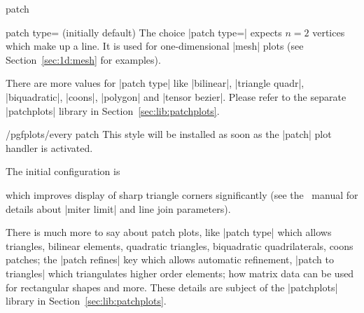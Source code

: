 {\begin{plottype}[/pgfplots]{patch}
\begin{pgfplotskey}{patch type= (initially default)}
	The choice |patch type=| expects $n=2$ vertices which make up a line. It is used for one-dimensional |mesh| plots (see Section~\ref{sec:1d:mesh} for examples).

	There are more values for |patch type| like |bilinear|, |triangle quadr|, |biquadratic|, |coons|, |polygon| and |tensor bezier|. Please refer to the separate |patchplots| library in Section~\ref{sec:lib:patchplots}.
\end{pgfplotskey}

\begin{stylekey}{/pgfplots/every patch}
	This style will be installed as soon as the |patch| plot handler is activated. 

	The initial configuration is
\begin{codeexample}
\end{codeexample}
	\noindent which improves display of sharp triangle corners significantly (see the \Tikz\ manual for details about |miter limit| and line join parameters).
\end{stylekey}

	There is much more to say about patch plots, like |patch type| which allows triangles, bilinear elements, quadratic triangles, biquadratic quadrilaterals, coons patches; the |patch refines| key which allows automatic refinement, |patch to triangles| which triangulates higher order elements;  how matrix data can be used for rectangular shapes and more. These details are subject of the |patchplots| library in Section~\ref{sec:lib:patchplots}.
\end{plottype}
}
